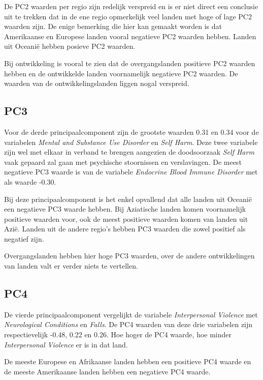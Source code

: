 \documentclass[a4paper,kulak]{kulakarticle}
\begin{document}
De PC2 waarden per regio zijn redelijk verspreid en is er niet direct een conclusie uit te trekken dat in de ene regio opmerkelijk veel landen met hoge of lage PC2 waarden zijn. De enige bemerking die hier kan gemaakt worden is dat Amerikaanse en Europese landen vooral negatieve PC2 waarden hebben. Landen uit Oceani\"e hebben posieve PC2 waarden. 

Bij ontwikkeling is vooral te zien dat de overgangslanden positieve PC2 waarden hebben en de ontwikkelde landen voornamelijk negatieve PC2 waarden. De waarden van de ontwikkelingslanden liggen nogal verspreid.






\subsection{PC3}
Voor de derde principaalcomponent zijn de grootste waarden 0.31 en 0.34 voor de variabelen \textit{Mental and Substance Use Disorder} en \textit{Self Harm}. Deze twee variabele zijn wel met elkaar in verband te brengen aangezien de doodsoorzaak \textit{Self Harm} vaak gepaard zal gaan met psychische stoornissen en verslavingen. De meest negatieve PC3 waarde is van de variabele \textit{Endocrine Blood Immune Disorder} met als waarde -0.30.

Bij deze principaalcomponent is het enkel opvallend dat alle landen uit Oceani\"e een negatieve PC3 waarde hebben. Bij Aziatische landen komen voornamelijk positieve waarden voor, ook de meest positieve waarden komen van landen uit Azi\"e. Landen uit de andere regio's hebben PC3 waarden die zowel positief als negatief zijn. 


Overgangslanden hebben hier hoge PC3 waarden, over de andere ontwikkelingen van landen valt er verder niets te vertellen.


\subsection{PC4}
De vierde principaalcomponent vergelijkt de variabele \textit{Interpersonal Violence} met \textit{Neurological Conditions} en \textit{Falls}. De PC4 waarden van deze drie variabelen zijn respectievelijk -0.48, 0.22 en 0.26. Hoe hoger de PC4 waarde, hoe minder \textit{Interpersonal Violence} er is in dat land. 


De meeste Europese en Afrikaanse landen hebben een positieve PC4 waarde en de meeste Amerikaanse landen hebben een negatieve PC4 waarde. 
\end{document}
